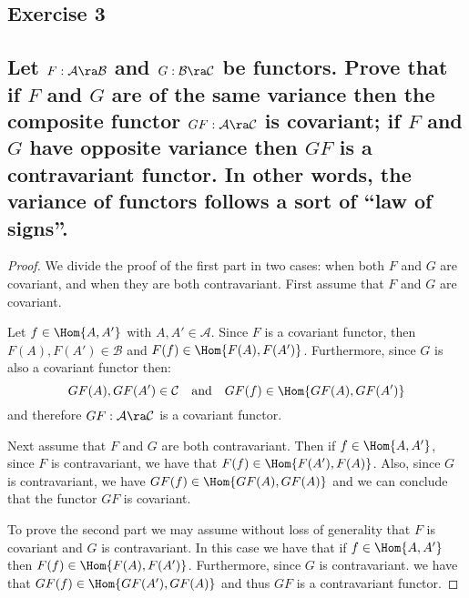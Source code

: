 \HRule
\subsection*{Exercise 3}
\subsection*{%
Let $F:\mathcal{A}\ra\mathcal{B}$ and $G:\mathcal{B}\ra\mathcal{C}$ be functors. Prove that if $F$ and $G$ are of the same variance
then the composite functor $GF:\mathcal{A}\ra\mathcal{C}$ is covariant; if $F$ and $G$ have opposite variance then $GF$ is a
contravariant functor. In other words, the variance of functors follows a sort of ``law of signs''.
} 

\begin{proof}%
We divide the proof of the first part in two cases: when both $F$ and $G$ are covariant, and when they are both contravariant.
First assume that $F$ and $G$ are covariant.

Let $f\in\Hom{A,A'}$ with $A,A'\in\mathcal{A}$. Since $F$ is a covariant functor, then $F(A),F(A')\in \mathcal{B}$ and
$F(f)\in\Hom{F(A),F(A')}$. Furthermore, since $G$ is also a covariant functor then:
\[
	GF(A),GF(A')\in\mathcal{C} \quad\text{and}\quad GF(f)\in\Hom{GF(A),GF(A')}
\]
and therefore $GF:\mathcal{A}\ra\mathcal{C}$ is a covariant functor.

Next assume that $F$ and $G$ are both contravariant. Then if $f\in\Hom{A,A'}$, since $F$ is contravariant, we have that
$F(f)\in\Hom{F(A'),F(A)}$. Also, since $G$ is contravariant, we have $GF(f)\in\Hom{GF(A),GF(A)}$ and we can conclude
that the functor $GF$ is covariant.

To prove the second part we may assume without loss of generality that $F$ is covariant and $G$ is contravariant.
In this case we have that if $f\in\Hom{A,A'}$ then $F(f)\in\Hom{F(A),F(A')}$. Furthermore, since $G$ is contravariant.
we have that $GF(f)\in\Hom{GF(A'),GF(A)}$ and thus $GF$ is a contravariant functor. 
%
\end{proof}%

